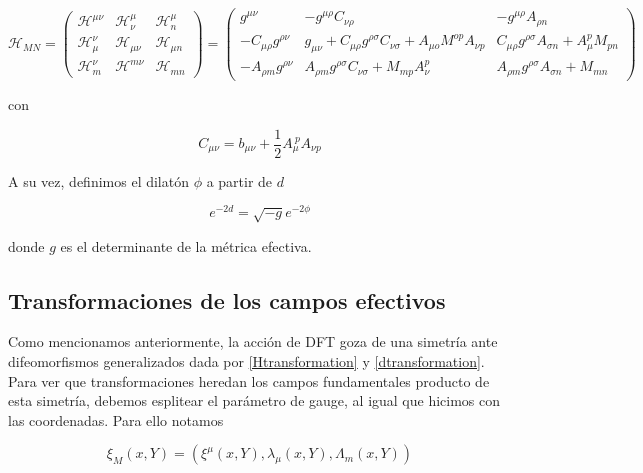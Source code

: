 \documentclass{article}
\numberwithin{equation}{section}
\begin{document}
\begin{equation}\label{HKK}
\mathcal{H}_{MN}=
\begin{pmatrix}
\mathcal{H}^{\mu \nu} & \mathcal{H}^{\mu}_{\nu} & \mathcal{H}^{\mu}_n\\
\mathcal{H}_{\mu}^{\nu} & \mathcal{H}_{\mu \nu} & \mathcal{H}_{\mu n}\\
\mathcal{H}_{m}^{\nu} & \mathcal{H}^{m \nu} & \mathcal{H}_{m n} 
\end{pmatrix}
=
\begin{pmatrix}
g^{\mu \nu} & -g^{\mu \rho} C_{\nu \rho} & -g^{\mu \rho} A_{\rho n}\\
-C_{\mu \rho}g^{\rho \nu }  & g_{\mu \nu} + C_{\mu \rho}g^{\rho \sigma } C_{\nu \sigma} + A_{\mu o} M^{o p} A_{\nu p}  &  C_{\mu \rho}g^{\rho \sigma } A_{\sigma n} + A_{\mu}^p M_{p n} \\
-A_{\rho m}g^{\rho \nu } & A_{\rho m} g^{\rho \sigma} C_{\nu \sigma} + M_{m p} A_{\nu}^p  &  A_{\rho m}g^{\rho \sigma } A_{\sigma n} + M_{m n}
\end{pmatrix}
\end{equation}

con

\begin{equation}
C_{\mu \nu} = b_{\mu \nu} + \frac{1}{2} A_{\mu}^{\ p} A_{\nu p}
\end{equation}

A su vez, definimos el dilatón $ \phi $ a partir de $ d $

\begin{equation}\label{dKK}
e^{-2 d} = \sqrt{-g}e^{-2 \phi}
\end{equation}

donde $ g $ es el determinante de la métrica efectiva.

\subsection{\textcolor{teal!60!white}{Transformaciones de los campos efectivos}}\label{sec_transformaciones}

Como mencionamos anteriormente, la acción de DFT goza de una simetría ante difeomorfismos generalizados dada por \ref{Htransformation} y \ref{dtransformation}. Para ver que transformaciones heredan los campos fundamentales producto de esta simetría, debemos esplitear el parámetro de gauge, al igual que hicimos con las coordenadas. Para ello notamos

\begin{equation}\label{parametros}
\xi_M(x,Y)=(\xi^{\mu}(x,Y), \lambda_{\mu}(x,Y), \Lambda_m(x,Y))
\end{equation}
\end{document}
